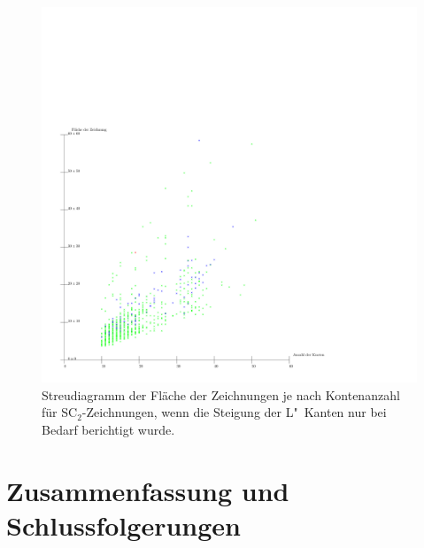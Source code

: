 \documentclass[a4paper]{scrreprt}
\theoremstyle{definition}
\begin{document}
\begin{figure}[p]
  \centering
  \includegraphics[width=\textwidth]{plots/smooth-opti}
  \caption{Streudiagramm der Fläche der Zeichnungen je nach Kontenanzahl für SC$_2$-Zeichnungen, wenn die Steigung der L"~Kanten nur bei Bedarf berichtigt wurde.}
  \label{fig:smooth-opti}
\end{figure}




\chapter{Zusammenfassung und Schlussfolgerungen}







\end{document}

